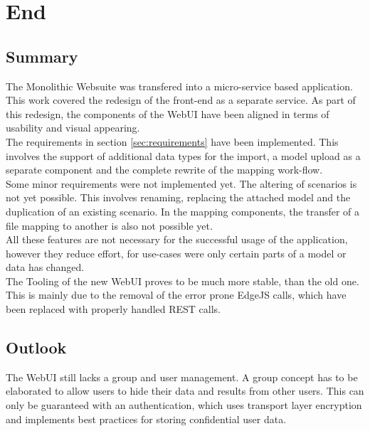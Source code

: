 
\chapter{End}



\section{Summary}
The Monolithic Websuite was transfered into a micro-service based application. This work covered the redesign of the front-end as a separate service. As part of this redesign, the components of the WebUI have been aligned in terms of usability and visual appearing.\\
The requirements in section \ref{sec:requirements} have been implemented. This involves the support of additional data types for the import, a model upload as a separate component and the complete rewrite of the mapping work-flow.\\
Some minor requirements were not implemented yet. The altering of scenarios is not yet possible. This involves renaming, replacing the attached model and the duplication of an existing scenario. In the mapping components, the transfer of a file mapping to another is also not possible yet.\\
All these features are not necessary for the successful usage of the application, however they reduce effort, for use-cases were only certain parts of a model or data has changed.\\
The Tooling of the new WebUI proves to be much more stable, than the old one. This is mainly due to the removal of the error prone EdgeJS calls, which have been replaced with properly handled REST calls.



\section{Outlook}
The WebUI still lacks a group and user management. A group concept has to be elaborated to allow users to hide their data and results from other users. This can only be guaranteed with an authentication, which uses transport layer encryption and implements best practices for storing confidential user data.
